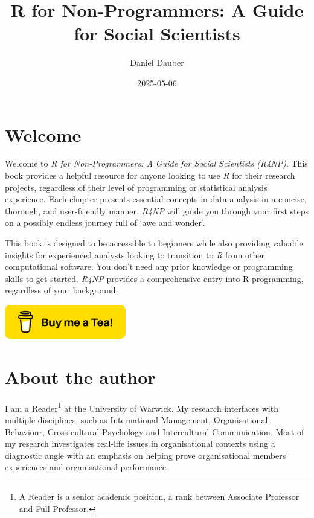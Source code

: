 \documentclass[
  letterpaper,
  DIV=11,
  numbers=noendperiod]{scrreprt}
\title{R for Non-Programmers: A Guide for Social Scientists}
\author{Daniel Dauber}
\date{2025-05-06}
\renewcommand*\contentsname{Table of contents}
\newcommand\contentsname{Table of contents}
\begin{document}
\maketitle

\renewcommand*\contentsname{Table of contents}
{
\hypersetup{linkcolor=}
\setcounter{tocdepth}{2}
\tableofcontents
}

\chapter*{Welcome}\label{welcome}


Welcome to \emph{R for Non-Programmers: A Guide for Social Scientists
(R4NP)}. This book provides a helpful resource for anyone looking to use
\emph{R} for their research projects, regardless of their level of
programming or statistical analysis experience. Each chapter presents
essential concepts in data analysis in a concise, thorough, and
user-friendly manner. \emph{R4NP} will guide you through your first
steps on a possibly endless journey full of `awe and wonder'.

This book is designed to be accessible to beginners while also providing
valuable insights for experienced analysts looking to transition to
\emph{R} from other computational software. You don't need any prior
knowledge or programming skills to get started. \emph{R4NP} provides a
comprehensive entry into R programming, regardless of your background.

\href{https://www.buymeacoffee.com/thesocialsciencesofa}{\includegraphics[width=2.08333in,height=\textheight]{images/cover_art_icons/buy_me_a_coffee_custom.png}}


\chapter*{About the author}\label{sec-about-the-author}


I am a Reader\footnote{A Reader is a senior academic position, a rank
  between Associate Professor and Full Professor.} at the University of
Warwick. My research interfaces with multiple disciplines, such as
International Management, Organisational Behaviour, Cross-cultural
Psychology and Intercultural Communication. Most of my research
investigates real-life issues in organisational contexts using a
diagnostic angle with an emphasis on helping prove organisational
members' experiences and organisational performance.
\end{document}
